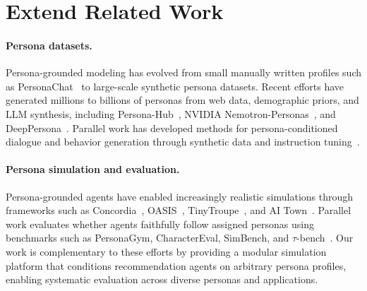 \section{Extend Related Work}

\paragraph{Persona datasets.} Persona-grounded modeling has evolved from small manually written profiles such as PersonaChat~\citep{zhang2018personachat} to large-scale synthetic persona datasets. Recent efforts have generated millions to billions of personas from web data, demographic priors, and LLM synthesis, including Persona-Hub~\citep{ge2024personahub}, NVIDIA Nemotron-Personas~\citep{nvidia2025nemotron}, and DeepPersona~\citep{deeppersona2025}. Parallel work has developed methods for persona-conditioned dialogue and behavior generation through synthetic data and instruction tuning~\citep{jandaghi2023syntheticpersonachat,wang2025opencharacter,wang2023selfinstruct}. 

\paragraph{Persona simulation and evaluation.} Persona-grounded agents have enabled increasingly realistic simulations through frameworks such as Concordia~\citep{vezhnevets2023concordia}, OASIS~\citep{yang2024oasis}, TinyTroupe~\citep{microsoft2024tinytroupe}, and AI Town~\citep{a16z2023aitown}. Parallel work evaluates whether agents faithfully follow assigned personas using benchmarks such as PersonaGym, CharacterEval, SimBench, and $\tau$-bench~\citep{samuel2024personagym,tu2024charactereval,simbench2025,yao2024taubench}. Our work is complementary to these efforts by providing a modular simulation platform that conditions recommendation agents on arbitrary persona profiles, enabling systematic evaluation across diverse personas and applications.



